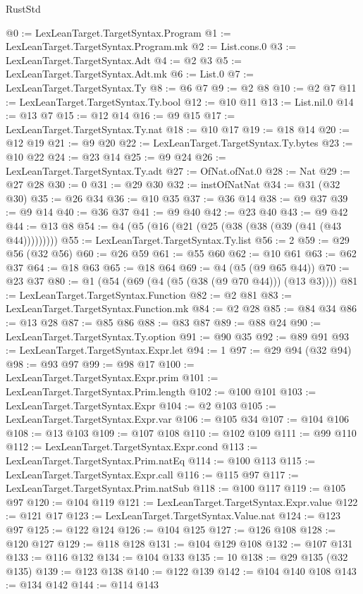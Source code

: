 \begin{lexlean}{RustStd}
\begin{coremodule}
{\begin{coremodule}
{{{{{{{{{{{{{{{{{{{{{{{{{{{{{{{{{{{{{{{{{{{{{{{{{{{{{{{@0 := LexLeanTarget.TargetSyntax.Program
@1 := LexLeanTarget.TargetSyntax.Program.mk
@2 := List.cons.{0}
@3 := LexLeanTarget.TargetSyntax.Adt
@4 := @2 @3
@5 := LexLeanTarget.TargetSyntax.Adt.mk
@6 := List.{0}
@7 := LexLeanTarget.TargetSyntax.Ty
@8 := @6 @7
@9 := @2 @8
@10 := @2 @7
@11 := LexLeanTarget.TargetSyntax.Ty.bool
@12 := @10 @11
@13 := List.nil.{0}
@14 := @13 @7
@15 := @12 @14
@16 := @9 @15
@17 := LexLeanTarget.TargetSyntax.Ty.nat
@18 := @10 @17
@19 := @18 @14
@20 := @12 @19
@21 := @9 @20
@22 := LexLeanTarget.TargetSyntax.Ty.bytes
@23 := @10 @22
@24 := @23 @14
@25 := @9 @24
@26 := LexLeanTarget.TargetSyntax.Ty.adt
@27 := OfNat.ofNat.{0}
@28 := Nat
@29 := @27 @28
@30 := 0
@31 := @29 @30
@32 := instOfNatNat
@34 := @31 (@32 @30)
@35 := @26 @34
@36 := @10 @35
@37 := @36 @14
@38 := @9 @37
@39 := @9 @14
@40 := @36 @37
@41 := @9 @40
@42 := @23 @40
@43 := @9 @42
@44 := @13 @8
@54 := @4 (@5 (@16 (@21 (@25 (@38 (@38 (@39 (@41 (@43 @44)))))))))
@55 := LexLeanTarget.TargetSyntax.Ty.list
@56 := 2
@59 := @29 @56 (@32 @56)
@60 := @26 @59
@61 := @55 @60
@62 := @10 @61
@63 := @62 @37
@64 := @18 @63
@65 := @18 @64
@69 := @4 (@5 (@9 @65 @44))
@70 := @23 @37
@80 := @1 (@54 (@69 (@4 (@5 (@38 (@9 @70 @44))) (@13 @3))))
@81 := LexLeanTarget.TargetSyntax.Function
@82 := @2 @81
@83 := LexLeanTarget.TargetSyntax.Function.mk
@84 := @2 @28
@85 := @84 @34
@86 := @13 @28
@87 := @85 @86
@88 := @83 @87
@89 := @88 @24
@90 := LexLeanTarget.TargetSyntax.Ty.option
@91 := @90 @35
@92 := @89 @91
@93 := LexLeanTarget.TargetSyntax.Expr.let
@94 := 1
@97 := @29 @94 (@32 @94)
@98 := @93 @97
@99 := @98 @17
@100 := LexLeanTarget.TargetSyntax.Expr.prim
@101 := LexLeanTarget.TargetSyntax.Prim.length
@102 := @100 @101
@103 := LexLeanTarget.TargetSyntax.Expr
@104 := @2 @103
@105 := LexLeanTarget.TargetSyntax.Expr.var
@106 := @105 @34
@107 := @104 @106
@108 := @13 @103
@109 := @107 @108
@110 := @102 @109
@111 := @99 @110
@112 := LexLeanTarget.TargetSyntax.Expr.cond
@113 := LexLeanTarget.TargetSyntax.Prim.natEq
@114 := @100 @113
@115 := LexLeanTarget.TargetSyntax.Expr.call
@116 := @115 @97
@117 := LexLeanTarget.TargetSyntax.Prim.natSub
@118 := @100 @117
@119 := @105 @97
@120 := @104 @119
@121 := LexLeanTarget.TargetSyntax.Expr.value
@122 := @121 @17
@123 := LexLeanTarget.TargetSyntax.Value.nat
@124 := @123 @97
@125 := @122 @124
@126 := @104 @125
@127 := @126 @108
@128 := @120 @127
@129 := @118 @128
@131 := @104 @129 @108
@132 := @107 @131
@133 := @116 @132
@134 := @104 @133
@135 := 10
@138 := @29 @135 (@32 @135)
@139 := @123 @138
@140 := @122 @139
@142 := @104 @140 @108
@143 := @134 @142
@144 := @114 @143
}}}}}}}}}}}}}}}}}}}}}}}}}}}}}}}}}}}}}}}}}}}}}}}}}}}}}}}
\end{coremodule}}
\end{coremodule}
\end{lexlean}
